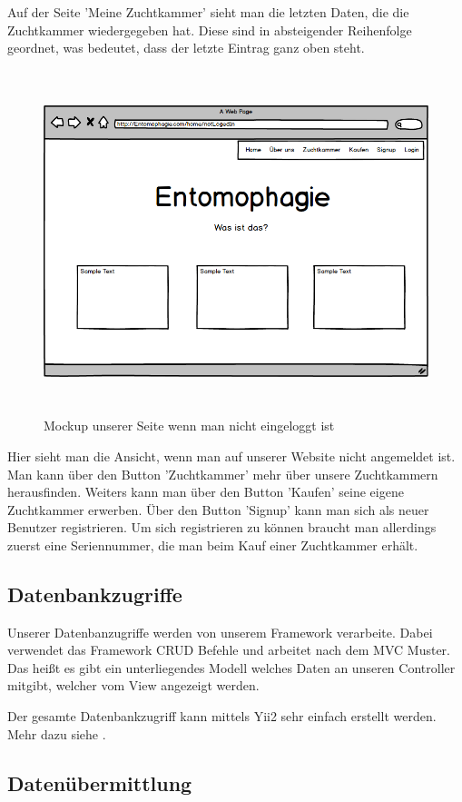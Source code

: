 Auf der Seite 'Meine Zuchtkammer' sieht man die letzten Daten, die die Zuchtkammer wiedergegeben hat. Diese sind in absteigender Reihenfolge geordnet, was bedeutet, dass der letzte Eintrag ganz oben steht.
\newpage
\begin{figure}
\includegraphics[height=10cm]{figures/NotlogedIN}
\caption{Mockup unserer Seite wenn man nicht eingeloggt ist}
\end{figure}                
Hier sieht man die Ansicht, wenn man auf unserer Website nicht angemeldet ist. Man kann über den Button 'Zuchtkammer' mehr über unsere Zuchtkammern herausfinden. Weiters kann man über den Button 'Kaufen' seine eigene Zuchtkammer erwerben. Über den Button 'Signup' kann man sich als neuer Benutzer registrieren. Um sich registrieren zu können braucht man allerdings zuerst eine Seriennummer, die man beim Kauf einer Zuchtkammer erhält.
\newpage

\subsection{Datenbankzugriffe}                              Unserer Datenbanzugriffe werden von unserem Framework verarbeite. Dabei verwendet das Framework CRUD Befehle und arbeitet nach dem MVC Muster. Das heißt es gibt ein unterliegendes Modell welches Daten an unseren Controller mitgibt, welcher vom View angezeigt werden.

Der gesamte Datenbankzugriff kann mittels Yii2 sehr einfach erstellt werden. Mehr dazu siehe .

\subsection{Datenübermittlung} \label{sec:daten}
                                 

